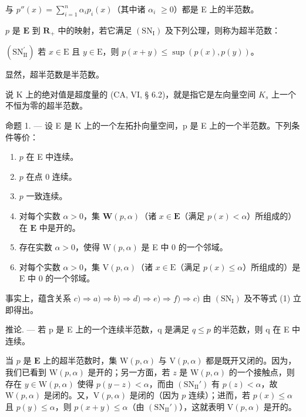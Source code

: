 与 \(p''(x) = \sum_{i=1}^{n} \alpha_i p_i(x)\)（其中诸 \(\alpha_i\) \(\geqslant 0\)）都是 E 上的半范数。

\(p\) 是 \(\mathbf{E}\) 到 \(\mathbf{R}_{+}\) 中的映射，若它满足 \((\mathrm{SN}_{\mathrm{I}})\) 及下列公理，则称为超半范数：

\((\mathrm{SN}_{\mathrm{II}}^{\prime})\) 若 \(x \in \mathrm{E}\) 且 \(y \in \mathrm{E}\)，则 \(p(x + y) \leqslant \sup(p(x), p(y))\)。

显然，超半范数是半范数。

说 K 上的绝对值是超度量的 (CA, VI, § 6.2)，就是指它是左向量空间 \(K_{s}\) 上一个不恒为零的超半范数。

命题 1. --- 设 E 是 K 上的一个左拓扑向量空间，p 是 E 上的一个半范数。下列条件等价：

\begin{enumerate}
\def\labelenumi{\alph{enumi})}
\item
  \(p\) 在 E 中连续。
\item
  \(p\) 在点 0 连续。
\item
  \(p\) 一致连续。
\item
  对每个实数 \(\alpha > 0\)，集 \(\mathbf{W}(p, \alpha)\)（诸 \(x \in \mathbf{E}\)（满足 \(p(x) < \alpha\)）所组成的）在 \(\mathbf{E}\) 中是开的。
\item
  存在实数 \(\alpha > 0\)，使得 \(\mathrm{W}(p, \alpha)\) 是 E 中 0 的一个邻域。
\item
  对每个实数 \(\alpha > 0\)，集 \(\mathrm{V}(p, \alpha)\)（诸 \(x \in \mathrm{E}\)（满足 \(p(x) \leqslant \alpha\)）所组成的）是 \(\mathrm{E}\) 中 0 的一个邻域。
\end{enumerate}

事实上，蕴含关系 \(c) \Rightarrow a) \Rightarrow b) \Rightarrow d) \Rightarrow e) \Rightarrow f) \Rightarrow c)\) 由 \((\mathrm{SN}_{\mathrm{I}})\) 及不等式 (1) 立即得出。

推论. --- 若 p 是 E 上的一个连续半范数，q 是满足 \(q \leqslant p\) 的半范数，则 q 在 E 中连续。

当 \(p\) 是 \(\mathbf{E}\) 上的超半范数时，集 \(\mathrm{W}(p, \alpha)\) 与 \(\mathrm{V}(p, \alpha)\) 都是既开又闭的。因为，我们已看到 \(\mathrm{W}(p, \alpha)\) 是开的；另一方面，若 \(z\) 是 \(\mathrm{W}(p, \alpha)\) 的一个接触点，则存在 \(y \in \mathrm{W}(p, \alpha)\) 使得 \(p(y - z) < \alpha\)，而由 \((\mathrm{SN}_{\mathrm{II}}')\) 有 \(p(z) < \alpha\)，故 \(\mathrm{W}(p, \alpha)\) 是闭的。又，\(\mathrm{V}(p, \alpha)\) 是闭的（因为 \(p\) 连续）；进而，若 \(p(x) \leqslant \alpha\) 且 \(p(y) \leqslant \alpha\)，则 \(p(x + y) \leqslant \alpha\)（由 \((\mathrm{SN}_{\mathrm{II}}')\)），这就表明 \(\mathrm{V}(p, \alpha)\) 是开的。

